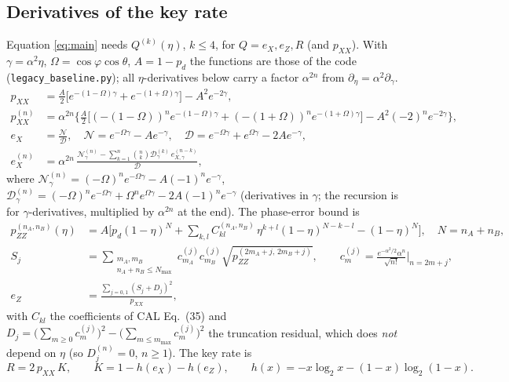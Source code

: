 \documentclass[11pt,a4paper]{article}
\theoremstyle{plain}
\theoremstyle{remark}
\begin{document}
\subsection{Derivatives of the key rate}
\label{sec:deriv}

Equation \eqref{eq:main} needs $Q^{(k)}(\eta)$, $k\le4$, for $Q=e_X,e_Z,R$ (and $p_{XX}$). With $\gamma=\alpha^2\eta$, $\Omega=\cos\varphi\cos\theta$, $A=1-p_d$ the functions are those of the code (\texttt{legacy\_baseline.py}); all $\eta$-derivatives below carry a factor $\alpha^{2n}$ from $\partial_\eta=\alpha^2\partial_\gamma$.
\begin{align}
  p_{XX}&=\tfrac A2\big[e^{-(1-\Omega)\gamma}+e^{-(1+\Omega)\gamma}\big]-A^2e^{-2\gamma},\\
  p_{XX}^{(n)}&=\alpha^{2n}\Big\{\tfrac A2\big[(-(1-\Omega))^{n}e^{-(1-\Omega)\gamma}+(-(1+\Omega))^{n}e^{-(1+\Omega)\gamma}\big]-A^2(-2)^{n}e^{-2\gamma}\Big\},\\
  e_X&=\frac{\mathcal N}{\mathcal D},\quad \mathcal N=e^{-\Omega\gamma}-Ae^{-\gamma},\quad \mathcal D=e^{-\Omega\gamma}+e^{\Omega\gamma}-2Ae^{-\gamma},\\
  e_X^{(n)}&=\alpha^{2n}\,\frac{\mathcal N_\gamma^{(n)}-\sum_{k=1}^{n}\binom nk\mathcal D_\gamma^{(k)}\,e_{X,\gamma}^{(n-k)}}{\mathcal D},
\end{align}
where $\mathcal N_\gamma^{(n)}=(-\Omega)^ne^{-\Omega\gamma}-A(-1)^ne^{-\gamma}$, $\mathcal D_\gamma^{(n)}=(-\Omega)^ne^{-\Omega\gamma}+\Omega^ne^{\Omega\gamma}-2A(-1)^ne^{-\gamma}$ (derivatives in $\gamma$; the recursion is for $\gamma$-derivatives, multiplied by $\alpha^{2n}$ at the end). The phase-error bound is
\begin{align}
  p_{ZZ}^{(n_A,n_B)}(\eta)&=A\Big[p_d(1-\eta)^{N}+\sum_{k,l}C^{(n_A,n_B)}_{kl}\,\eta^{k+l}(1-\eta)^{N-k-l}-(1-\eta)^{N}\Big],\quad N=n_A+n_B,\\
  S_j&=\sum_{\substack{m_A,m_B\\ n_A+n_B\le N_{\max}}}c^{(j)}_{m_A}c^{(j)}_{m_B}\sqrt{p_{ZZ}^{(2m_A+j,\,2m_B+j)}},\qquad
  c^{(j)}_{m}=\frac{e^{-\alpha^2/2}\alpha^{n}}{\sqrt{n!}}\Big|_{n=2m+j},\\
  e_Z&=\frac{\sum_{j=0,1}(S_j+D_j)^2}{p_{XX}},
\end{align}
with $C_{kl}$ the coefficients of CAL Eq.~(35) and $D_j=\big(\sum_{m\ge0}c^{(j)}_m\big)^2-\big(\sum_{m\le m_{\max}}c^{(j)}_m\big)^2$ the truncation residual, which does \emph{not} depend on $\eta$ (so $D_j^{(n)}=0$, $n\ge1$). The key rate is
\begin{equation}
  R=2\,p_{XX}\,K,\qquad K=1-h(e_X)-h(e_Z),\qquad h(x)=-x\log_2x-(1-x)\log_2(1-x).
\end{equation}
\end{document}
